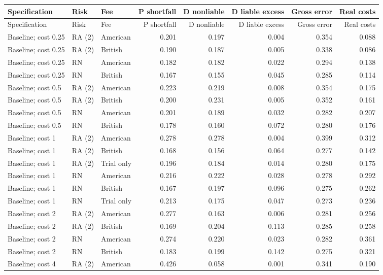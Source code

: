 \documentclass[10pt]{article}
\begin{document}
\begin{longtable}{@{}p{3.0in}llrrrrr@{}}
\toprule Specification & Risk & Fee & P shortfall & D nonliable & D liable excess & Gross error & Real costs\\\midrule\endfirsthead
\toprule Specification & Risk & Fee & P shortfall & D nonliable & D liable excess & Gross error & Real costs\\\midrule\endhead
\bottomrule\endfoot
Baseline; cost 0.25 & RA (2) & American & 0.201 & 0.197 & 0.004 & 0.354 & 0.088\\
Baseline; cost 0.25 & RA (2) & British & 0.190 & 0.187 & 0.005 & 0.338 & 0.086\\
Baseline; cost 0.25 & RN & American & 0.182 & 0.182 & 0.022 & 0.294 & 0.138\\
Baseline; cost 0.25 & RN & British & 0.167 & 0.155 & 0.045 & 0.285 & 0.114\\
Baseline; cost 0.5 & RA (2) & American & 0.223 & 0.219 & 0.008 & 0.354 & 0.175\\
Baseline; cost 0.5 & RA (2) & British & 0.200 & 0.231 & 0.005 & 0.352 & 0.161\\
Baseline; cost 0.5 & RN & American & 0.201 & 0.189 & 0.032 & 0.282 & 0.207\\
Baseline; cost 0.5 & RN & British & 0.178 & 0.160 & 0.072 & 0.280 & 0.176\\
Baseline; cost 1 & RA (2) & American & 0.278 & 0.278 & 0.004 & 0.399 & 0.312\\
Baseline; cost 1 & RA (2) & British & 0.168 & 0.156 & 0.064 & 0.277 & 0.142\\
Baseline; cost 1 & RA (2) & Trial only & 0.196 & 0.184 & 0.014 & 0.280 & 0.175\\
Baseline; cost 1 & RN & American & 0.216 & 0.222 & 0.028 & 0.278 & 0.292\\
Baseline; cost 1 & RN & British & 0.167 & 0.197 & 0.096 & 0.275 & 0.262\\
Baseline; cost 1 & RN & Trial only & 0.213 & 0.175 & 0.047 & 0.273 & 0.236\\
Baseline; cost 2 & RA (2) & American & 0.277 & 0.163 & 0.006 & 0.281 & 0.256\\
Baseline; cost 2 & RA (2) & British & 0.169 & 0.204 & 0.113 & 0.285 & 0.258\\
Baseline; cost 2 & RN & American & 0.274 & 0.220 & 0.023 & 0.282 & 0.361\\
Baseline; cost 2 & RN & British & 0.183 & 0.199 & 0.142 & 0.275 & 0.321\\
Baseline; cost 4 & RA (2) & American & 0.426 & 0.058 & 0.001 & 0.341 & 0.190\\

\end{longtable}
\end{document}
